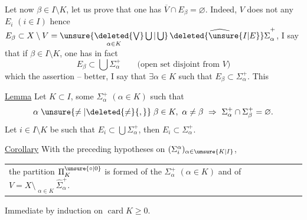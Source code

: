 Let now $\beta\in I\setminus K$, let us prove that one has $\overline V\cap E_\beta=\varnothing$. Indeed, $V$ does not   any $E_i$ $(i\in I)$ hence $E_\beta\subset X\setminus V=\mathop{\unsure{\deleted{\bigvee}\bigcup|\bigcup}}\limits_{\alpha\in K}\widehat{\deleted{\unsure{I|E}}\Sigma}_\alpha^+$,  I say that if $\beta\in I\setminus K$, one has in fact
\[
E_\beta\subset\bigcup\Sigma_\alpha^+\qquad\text{(open set disjoint from }V\text{)}
\]
\reversemarginpar{}\normalmarginpar
which  the assertion -- better, I say that $\exists\alpha\in K$ such that $E_\beta\subset\Sigma_\alpha^+$. This  

\uline{Lemma} Let $K\subset I$,   some $\Sigma_\alpha^+$ $(\alpha\in K)$ such that
\[
\alpha\mathrel{\unsure{\ne|\deleted{\ne}{,}}}\beta\in K,\ \alpha\ne\beta\ \Rightarrow\ \Sigma_\alpha^+\cap\Sigma_\beta^+=\varnothing.
\]
Let $i\in I\setminus K$ be such that $E_i\subset\bigcup\Sigma_\alpha^+$, then   $E_i\subset\Sigma_\alpha^+$.

   

\uline{Corollary} With the preceding hypotheses on $(\Sigma_i^\alpha)_{\alpha\in\unsure{K|I}}$,

\noindent\begin{tabular}{@{}|p{.96\linewidth}@{}}
the partition $\Pi_K^{\unsure{\circ|0}}$ is formed of the $\Sigma_\alpha^+$ $(\alpha\in K)$ and of $V=X\setminus\mathop{\overline{\bigcup}}\limits_{\alpha\in K}\widehat{\Sigma}_\alpha^+$.
\end{tabular}

Immediate by induction on $\operatorname{card} K\geq 0$.
